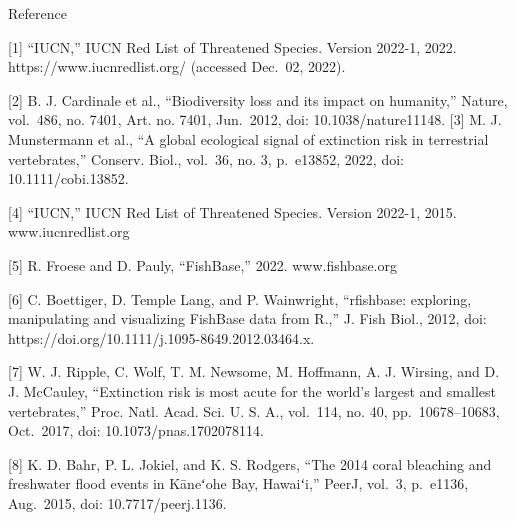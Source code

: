 \documentclass[
  letterpaper,
  DIV=11,
  numbers=noendperiod]{scrartcl}
\begin{document}
Reference

{[}1{]} ``IUCN,'' IUCN Red List of Threatened Species. Version 2022-1,
2022. https://www.iucnredlist.org/ (accessed Dec.~02, 2022).

{[}2{]} B. J. Cardinale et al., ``Biodiversity loss and its impact on
humanity,'' Nature, vol.~486, no. 7401, Art. no. 7401, Jun.~2012, doi:
10.1038/nature11148. {[}3{]} M. J. Munstermann et al., ``A global
ecological signal of extinction risk in terrestrial vertebrates,''
Conserv. Biol., vol.~36, no. 3, p.~e13852, 2022, doi:
10.1111/cobi.13852.

{[}4{]} ``IUCN,'' IUCN Red List of Threatened Species. Version 2022-1,
2015. www.iucnredlist.org

{[}5{]} R. Froese and D. Pauly, ``FishBase,'' 2022. www.fishbase.org

{[}6{]} C. Boettiger, D. Temple Lang, and P. Wainwright, ``rfishbase:
exploring, manipulating and visualizing FishBase data from R.,'' J. Fish
Biol., 2012, doi: https://doi.org/10.1111/j.1095-8649.2012.03464.x.

{[}7{]} W. J. Ripple, C. Wolf, T. M. Newsome, M. Hoffmann, A. J.
Wirsing, and D. J. McCauley, ``Extinction risk is most acute for the
world's largest and smallest vertebrates,'' Proc. Natl. Acad. Sci. U. S.
A., vol.~114, no. 40, pp.~10678--10683, Oct.~2017, doi:
10.1073/pnas.1702078114.

{[}8{]} K. D. Bahr, P. L. Jokiel, and K. S. Rodgers, ``The 2014 coral
bleaching and freshwater flood events in Kāneʻohe Bay, Hawaiʻi,'' PeerJ,
vol.~3, p.~e1136, Aug.~2015, doi: 10.7717/peerj.1136.
\end{document}
